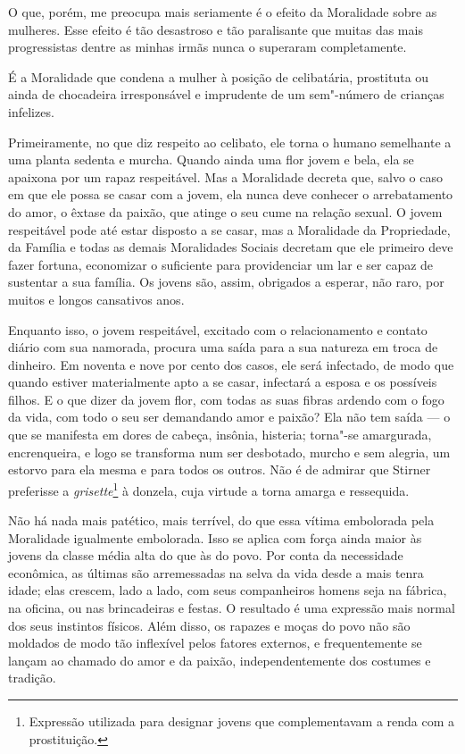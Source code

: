 
O que, porém, me preocupa mais seriamente é o efeito da Moralidade sobre
as mulheres. Esse efeito é tão desastroso e tão paralisante que muitas
das mais progressistas dentre as minhas irmãs nunca o superaram
completamente.

É a Moralidade que condena a mulher à posição de celibatária, prostituta
ou ainda de chocadeira irresponsável e imprudente de um sem"-número de
crianças infelizes.

Primeiramente, no que diz respeito ao celibato, ele torna o humano
semelhante a uma planta sedenta e murcha. Quando ainda uma flor jovem e
bela, ela se apaixona por um rapaz respeitável. Mas a Moralidade decreta
que, salvo o caso em que ele possa se casar com a jovem, ela nunca deve
conhecer o arrebatamento do amor, o êxtase da paixão, que atinge o seu
cume na relação sexual. O jovem respeitável pode até estar disposto a se
casar, mas a Moralidade da Propriedade, da Família e todas as demais
Moralidades Sociais decretam que ele primeiro deve fazer fortuna,
economizar o suficiente para providenciar um lar e ser capaz de
sustentar a sua família. Os jovens são, assim, obrigados a esperar, não
raro, por muitos e longos cansativos anos.

Enquanto isso, o jovem respeitável, excitado com o relacionamento e
contato diário com sua namorada, procura uma saída para a sua natureza em
troca de dinheiro. Em noventa e nove por cento dos casos, ele será
infectado, de modo que quando estiver materialmente apto a se casar,
infectará a esposa e os possíveis filhos. E o que dizer da jovem flor,
com todas as suas fibras ardendo com o fogo da vida, com todo o seu ser
demandando amor e paixão? Ela não tem saída --- o que se manifesta em
dores de cabeça, insônia, histeria; torna"-se amargurada, encrenqueira, e
logo se transforma num ser desbotado, murcho e sem alegria, um estorvo
para ela mesma e para todos os outros. Não é de admirar que Stirner
preferisse a \emph{grisette}\footnote{Expressão utilizada para designar
  jovens que complementavam a renda com a prostituição.} à donzela, cuja
virtude a torna amarga e ressequida.

Não há nada mais patético, mais terrível, do que essa vítima embolorada
pela Moralidade igualmente embolorada. Isso se aplica com força ainda
maior às jovens da classe média alta do que às do povo. Por conta da
necessidade econômica, as últimas são arremessadas na selva da vida
desde a mais tenra idade; elas crescem, lado a lado, com seus
companheiros homens seja na fábrica, na oficina, ou nas brincadeiras e
festas. O resultado é uma expressão mais normal dos seus instintos
físicos. Além disso, os rapazes e moças do povo não são moldados de modo
tão inflexível pelos fatores externos, e frequentemente se lançam ao
chamado do amor e da paixão, independentemente dos costumes e tradição.

